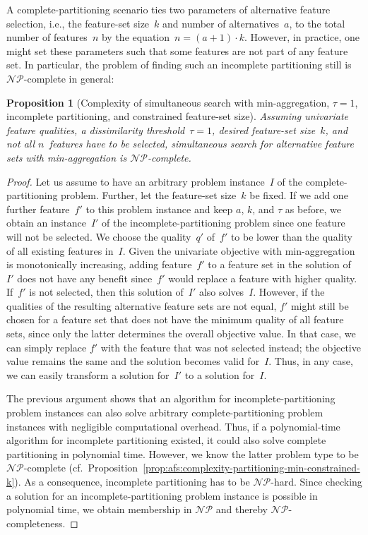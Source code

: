 \documentclass{article}
\newtheorem{proposition}{Proposition}
\theoremstyle{definition}
\begin{document}
A complete-partitioning scenario ties two parameters of alternative feature selection, i.e., the feature-set size~$k$ and number of alternatives~$a$, to the total number of features~$n$ by the equation~$n = (a+1) \cdot k$.
However, in practice, one might set these parameters such that some features are not part of any feature set.
In particular, the problem of finding such an incomplete partitioning still is $\mathcal{NP}$-complete in general:
%
\begin{proposition}[Complexity of simultaneous search with min-aggregation, $\tau=1$, incomplete partitioning, and constrained feature-set size]
	Assuming univariate feature qualities, a dissimilarity threshold~$\tau = 1$, desired feature-set size~$k$, and \emph{not} all $n$~features have to be selected, simultaneous search for alternative feature sets with min-aggregation is $\mathcal{NP}$-complete.
	\label{prop:afs:complexity-incomplete-partitioning-min-constrained-k}
\end{proposition}
%
\begin{proof}
Let us assume to have an arbitrary problem instance~$I$ of the complete-partitioning problem.
Further, let the feature-set size~$k$ be fixed.
If we add one further feature~$f'$ to this problem instance and keep $a$, $k$, and $\tau$ as before, we obtain an instance~$I'$ of the incomplete-partitioning problem since one feature will not be selected.
We choose the quality~$q'$ of~$f'$ to be lower than the quality of all existing features in~$I$.
Given the univariate objective with min-aggregation is monotonically increasing, adding feature~$f'$ to a feature set in the solution of~$I'$ does not have any benefit since~$f'$ would replace a feature with higher quality.
If~$f'$ is not selected, then this solution of~$I'$ also solves~$I$.
However, if the qualities of the resulting alternative feature sets are not equal, $f'$ might still be chosen for a feature set that does not have the minimum quality of all feature sets, since only the latter determines the overall objective value.
In that case, we can simply replace $f'$ with the feature that was not selected instead; the objective value remains the same and the solution becomes valid for~$I$.
Thus, in any case, we can easily transform a solution for~$I'$ to a solution for~$I$.

The previous argument shows that an algorithm for incomplete-partitioning problem instances can also solve arbitrary complete-partitioning problem instances with negligible computational overhead.
Thus, if a polynomial-time algorithm for incomplete partitioning existed, it could also solve complete partitioning in polynomial time.
However, we know the latter problem type to be $\mathcal{NP}$-complete (cf.~Proposition~\ref{prop:afs:complexity-partitioning-min-constrained-k}).
As a consequence, incomplete partitioning has to be $\mathcal{NP}$-hard.
Since checking a solution for an incomplete-partitioning problem instance is possible in polynomial time, we obtain membership in $\mathcal{NP}$ and thereby $\mathcal{NP}$-completeness.
\end{proof}
\end{document}
